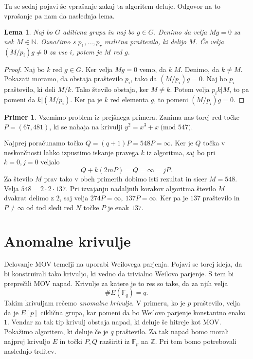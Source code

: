 \documentclass[12pt,a4paper,twoside]{article}
\theoremstyle{definition} %
\newtheorem{primer}[definicija]{Primer}
\theoremstyle{plain} %
\newtheorem{lema}[definicija]{Lema}
\numberwithin{equation}{section}  %
\newcommand{\N}{\mathbb N}
\newcommand{\Z}{\mathbb Z}
\newcommand{\F}{\mathbb F}
\newcommand{\E}[1]{E({#1})}
\newcommand{\MOD}[1]{\ \text{(mod }{#1}\text{)}}
\begin{document}
Tu se sedaj pojavi še vprašanje zakaj ta algoritem deluje. Odgovor na to vprašanje pa nam da naslednja lema.

\begin{lema}

Naj bo $G$ aditivna grupa in naj bo $g\in G$. Denimo da velja $Mg = 0$ za nek $M \in \N$. Označimo s $p_1,\ldots,p_r$ različna praštevila, ki delijo $M$. Če velja $(M/p_i)g \neq  0$ za vse $i$, potem je $M$ red $g$.

\end{lema}

\begin{proof}
Naj bo $k$ red $g\in G$. Ker velja $Mg = 0$ vemo, da $k|M$. Denimo, da $k \neq M$. Pokazati moramo, da obstaja praštevilo $p_i$, tako da $(M/p_i)g = 0$. Naj bo $p_i$ praštevilo, ki deli $M/k$. Tako število obstaja, ker $M \neq k$. Potem velja $p_ik|M$, to pa pomeni da $k|(M/p_i)$. Ker pa je $k$ red elementa $g$, to pomeni $(M/p_i)g = 0$.

\end{proof}


\begin{primer}
Vzemimo problem iz prejšnega primera. Zanima nas torej red točke \newline $P=(67,481)$, ki se nahaja na krivulji $y^2 = x^3+x \MOD{547}$.

Najprej poračunamo točko $Q = (q+1)P = 548P = \infty$. Ker je $Q$ točka v neskončnosti lahko izpustimo iskanje pravega $k$ iz algoritma, saj bo pri $k=0,j=0$ veljalo
$$Q+k(2mP) = Q =  \infty = jP.$$
Za število $M$ prav tako v obeh primerih dobimo isti rezultat in sicer $M = 548$. Velja $548=2\cdot 2\cdot 137$. Pri izvajanju nadaljnih korakov algoritma število $M$ dvakrat delimo z $2$, saj velja $274P = \infty, \ 137P = \infty$. Ker pa je $137$ praštevilo in $P \neq \infty$ od tod sledi red $N$ točke $P$ je enak $137$.

\end{primer}



\newpage

\section{Anomalne krivulje}

Delovanje MOV temelji na uporabi Weilovega parjenja. Pojavi se torej ideja, da bi konstruirali tako krivuljo, ki vedno da trivialno Weilovo parjenje. S tem bi preprečili MOV napad. Krivulje za katere je to res so take, da za njih velja
$$\#\E{\F_q} = q.$$
Takim krivuljam rečemo \emph{anomalne krivulje}. V primeru, ko je $p$ praštevilo, velja da je $E[p]$ ciklična grupa, kar pomeni da bo Weilovo parjenje konstantno enako $1$. Vendar za tak tip krivulj obstaja napad, ki deluje še hitreje kot MOV.
Pokažimo algoritem, ki deluje če je $q$ praštevilo.
Za tak napad bomo morali najprej krivuljo $E$ in točki $P,Q$ razširiti iz $\F_p$ na $\Z$. Pri tem bomo potrebovali naslednjo trditev.
\end{document}

